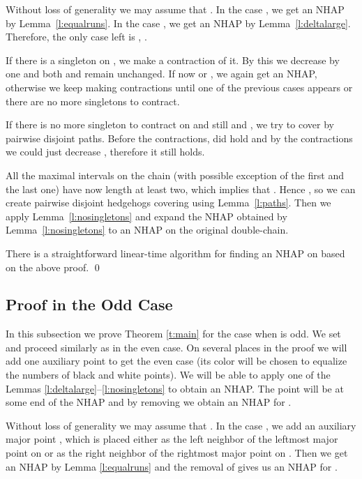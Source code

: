 \documentclass[12pt]{article}
\begin{document}
\begin{pfoftmain}
Without loss of generality we may assume that . In the case
, we get an NHAP by Lemma~\ref{l:equalruns}. In the case
, we get an NHAP by Lemma~\ref{l:deltalarge}. Therefore,
the only case left is , .

If there is a singleton on , we make a contraction of it. By this we
decrease  by one and both  and  remain unchanged. If
now  or , we again get an NHAP, otherwise
we keep making contractions until one of the previous cases appears or there
are no more singletons to contract.

If there is no more singleton to contract on  and still  and
, we try to cover  by  pairwise disjoint paths.
Before the contractions,  did hold and by the
contractions we could just decrease , therefore it still holds.

All the maximal intervals on the chain  (with possible exception of the
first and the last one) have now length at least two, which implies that
.
Hence , so we can create 
pairwise disjoint hedgehogs covering  using Lemma~\ref{l:paths}.
Then we apply Lemma~\ref{l:nosingletons} and expand the NHAP obtained
by Lemma~\ref{l:nosingletons} to an NHAP on the original double-chain.

There is a straightforward linear-time algorithm for finding an NHAP
on  based on the above proof.
\qed
\end{pfoftmain}




\subsection{Proof in the Odd Case}\label{s:odd}
In this subsection we prove Theorem \ref{t:main} for the case when 
is odd. We set  and proceed similarly as in the even case.
On several places in the proof we will add one auxiliary point
 to get the even case (its color will be chosen to equalize
the numbers of black and white points). We will be able to apply one of the
Lemmas \ref{l:deltalarge}--\ref{l:nosingletons} to obtain an NHAP.
The point  will be at some end of the NHAP and by removing
 we obtain an NHAP for .

Without loss of generality we may assume that . In the case
, we add an auxiliary major point , which is placed either as
the left neighbor of the leftmost major point on
 or as the right neighbor of the rightmost major point on . Then
we get an NHAP by Lemma \ref{l:equalruns} and the removal of  gives
us an NHAP for . 
\end{document}
